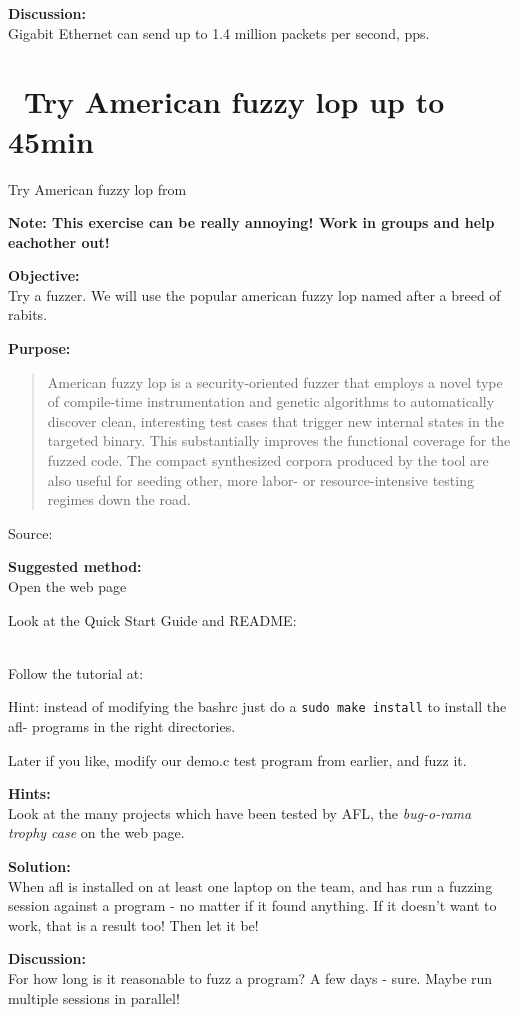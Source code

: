 \documentclass[a4paper,11pt,notitlepage]{report}
\begin{document}
{\bf Discussion:}\\
Gigabit Ethernet can send up to 1.4 million packets per second, pps.

\chapter{\faExclamationTriangle\ Try American fuzzy lop up to 45min}
\label{ex:american-fuzzy-lop}

Try American fuzzy lop from 

\textbf{Note: This exercise can be really annoying! Work in groups and help eachother out!}

{\bf Objective:}\\
Try a fuzzer. We will use the popular american fuzzy lop named after a breed of rabits.


{\bf Purpose:}
\begin{quote}
American fuzzy lop is a security-oriented fuzzer that employs a novel type of compile-time instrumentation and genetic algorithms to automatically discover clean, interesting test cases that trigger new internal states in the targeted binary. This substantially improves the functional coverage for the fuzzed code. The compact synthesized corpora produced by the tool are also useful for seeding other, more labor- or resource-intensive testing regimes down the road.
\end{quote}
Source: 

{\bf Suggested method:}\\
Open the web page 

Look at the Quick Start Guide and README:\\
\\

Follow the tutorial at:\\

Hint: instead of modifying the bashrc just do a \verb+sudo make install+ to install the afl- programs in the right directories.

Later if you like, modify our demo.c test program from earlier, and fuzz it.

{\bf Hints:}\\
Look at the many projects which have been tested by AFL, the \emph{bug-o-rama trophy case} on the web page.

{\bf Solution:}\\
When afl is installed on at least one laptop on the team, and has run a fuzzing session against a program - no matter if it found anything. If it doesn't want to work, that is a result too! Then let it be!

{\bf Discussion:}\\
For how long is it reasonable to fuzz a program? A few days - sure. Maybe run multiple sessions in parallel!
\end{document}
